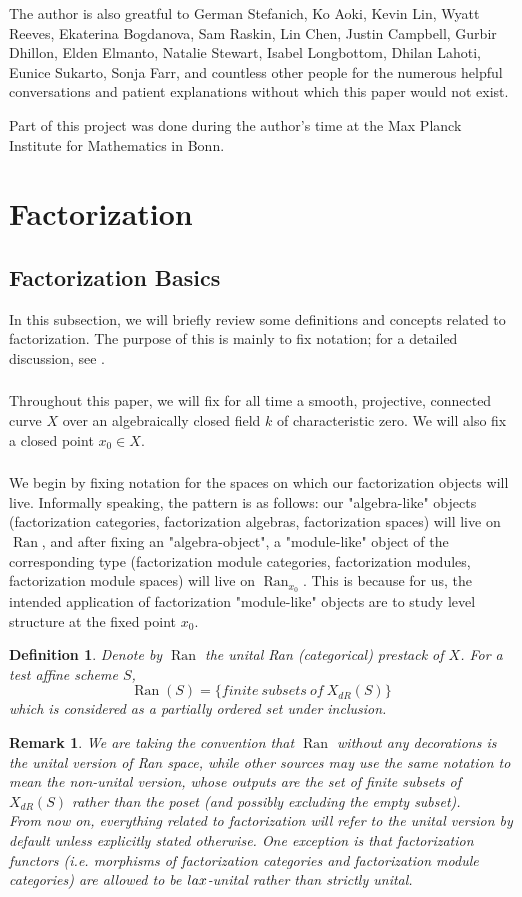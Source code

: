 \documentclass[10pt,a4paper]{amsart}
\newtheorem{defn}[subsubsection]{Definition}
\newtheorem{rem}[subsubsection]{Remark}
\newcommand{\on}[1]{\operatorname{#1}}
\newcommand{\Ran}{\on{Ran}}
\newcommand{\sssec}[1]{\subsubsection{}}
\begin{document}
The author is also greatful to German Stefanich, Ko Aoki, Kevin Lin, Wyatt Reeves, Ekaterina Bogdanova, Sam Raskin, Lin Chen, Justin Campbell, Gurbir Dhillon, Elden Elmanto, Natalie Stewart, Isabel Longbottom, Dhilan Lahoti, Eunice Sukarto, Sonja Farr, and countless other people for the numerous helpful conversations and patient explanations without which this paper would not exist.

Part of this project was done during the author’s time at the Max Planck Institute for Mathematics in Bonn.


\section{Factorization} \label{Factorization}
\subsection{Factorization Basics} \label{Factorization Basics}
In this subsection, we will briefly review some definitions and concepts related to factorization. The purpose of this is mainly to fix notation; for a detailed discussion, see \cite{factorization}.

\sssec{}
Throughout this paper, we will fix for all time a smooth, projective, connected curve $X$ over an algebraically closed field $k$ of characteristic zero. We will also fix a closed point $x_0 \in X$.

\sssec{}
We begin by fixing notation for the spaces on which our factorization objects will live. Informally speaking, the pattern is as follows: our "algebra-like" objects (factorization categories, factorization algebras, factorization spaces) will live on $\Ran$, and after fixing an "algebra-object", a "module-like" object of the corresponding type (factorization module categories, factorization modules, factorization module spaces) will live on $\Ran_{x_0}$. This is because for us, the intended application of factorization "module-like" objects are to study level structure at the fixed point $x_0$.

\begin{defn}
    Denote by $\Ran$ the unital Ran (categorical) prestack of $X$. For a test affine scheme $S$,
    $$
    \Ran(S) = \{finite \ subsets \ of \ X_{dR}(S)\}
    $$
    which is considered as a partially ordered set under inclusion.
\end{defn}

\begin{rem}
    We are taking the convention that $\Ran$ without any decorations is the unital version of Ran space, while other sources may use the same notation to mean the non-unital version, whose outputs are the \emph{set} of finite subsets of $X_{dR}(S)$ rather than the poset (and possibly excluding the empty subset).
    \\
    From now on, everything related to factorization will refer to the unital version by default unless explicitly stated otherwise. One exception is that factorization functors (i.e. morphisms of factorization categories and factorization module categories) are allowed to be $\emph{lax}$-unital rather than strictly unital.
\end{rem}
\end{document}
